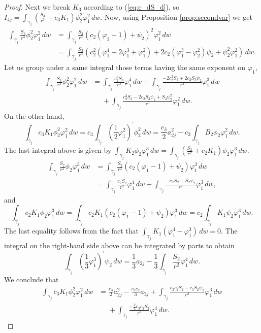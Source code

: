 \begin{proof}
Next we break $K_3$ according to (\ref{eq:c_dS_d}), so $I_{4j}=\int_{\gamma_j}\left(\frac{S_3}{r^3}+c_3K_1\right)\phi_2^2\varphi_1^2\,dw$. Now, using Proposition \ref{prop:secondvar} we get
\begin{align*} 
\int_{\gamma_j}\frac{S_3}{r^3}\phi_2^2\varphi_1^2\,dw	&= \int_{\gamma_j}\frac{S_3}{r^3}(c_2(\varphi_1-1)+\psi_2)^2\varphi_1^2\,dw \\
							&= \int_{\gamma_j}\frac{S_3}{r^3}(c_2^2(\varphi_1^4-2\varphi_1^3+\varphi_1^2)+2c_2(\varphi_1^3-\varphi_2^2)\psi_2+\psi_2^2\varphi_1^2)\,dw.
\end{align*}
Let us group under a same integral those terms having the same exponent on $\varphi_1$,
\begin{align}\label{eq:a5-I4-pt1}
\int_{\gamma_j}\frac{S_3}{r^3}\phi_2^2\varphi_1^2\,dw	&= \int_{\gamma_j}\frac{c_2^2S_3}{r^3}\varphi_1^4\,dw + \int_{\gamma_j}\frac{-2c_2^2S_3+2c_2S_3\psi_2}{r^3}\varphi_1^3\,dw \nonumber \\
							&\phantom{=} + \int_{\gamma_j}\frac{c_2^2S_3-2c_2S_3\psi_2+S_3\psi_2^2}{r^3}\varphi_1^2\,dw.
\end{align}
On the other hand,
\[ \int_{\gamma_j}c_3K_1\phi_2^2\varphi_1^2\,dw=c_3\int_{\gamma_j}\left(\frac{1}{2}\varphi_1^2\right)^{\prime}\phi_2^2\,dw=\frac{c_3}{2}a_{2j}^2-c_3\int_{\gamma_j}B_2\phi_2\varphi_1^2\,dw. \]
The last integral above is given by $\int_{\gamma_j}K_2\phi_2\varphi_1^3\,dw=\int_{\gamma_j}\left(\frac{S_2}{r^2}+c_2K_1\right)\phi_2\varphi_1^3\,dw$.
\begin{align*}
\int_{\gamma_j}\frac{S_2}{r^2}\phi_2\varphi_1^3\,dw &= \int_{\gamma_j}\frac{S_2}{r^2}(c_2(\varphi_1-1)+\psi_2)\varphi_1^3\,dw\\
  &= \int_{\gamma_j}\frac{c_2S_2}{r^2}\varphi_1^4\,dw+\int_{\gamma_j}\frac{-c_2S_2+S_2\psi_2}{r^2}\varphi_1^3\,dw,
\end{align*}
and
\[ \int_{\gamma_j}c_2K_1\phi_2\varphi_1^3\,dw = \int_{\gamma_j}c_2K_1(c_2(\varphi_1-1)+\psi_2)\varphi_1^3\,dw = c_2\int_{\gamma_j}K_1\psi_2\varphi_1^3\,dw. \]
The last equality follows from the fact that $\int_{\gamma_j}K_1(\varphi_1^4-\varphi_1^3)\,dw=0$. The integral on the right-hand side above can be integrated by parts to obtain
\[ \int_{\gamma_j}\left(\frac{1}{3}\varphi_1^3\right)^{\prime}\psi_2\,dw=\frac{1}{3}a_{2j}-\frac{1}{3}\int_{\gamma_j}\frac{S_2}{r^2}\varphi_1^4\,dw. \]
We conclude that
\begin{align}
\int_{\gamma_j}c_3K_1\phi_2^2\varphi_1^2\,dw &= \frac{c_3}{2}a_{2j}^2-\frac{c_3c_2}{3}a_{2j}+\int_{\gamma_j}\frac{c_3c_2S_2-c_3S_2\psi_2}{r^2}\varphi_1^3\,dw\nonumber \\
  &\phantom{=} + \int_{\gamma_j}\frac{-\frac{2}{3}c_3c_2S_2}{r^2}\varphi_1^4\,dw.\label{eq:a5-I4-pt2}
\end{align}


\end{proof}
